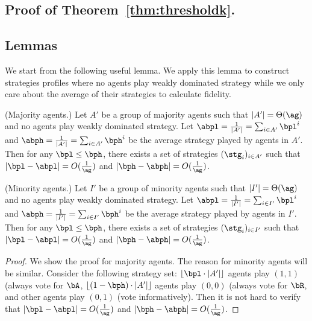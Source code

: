 \subsection{Proof of Theorem~\ref{thm:thresholdk}.}

\subsection{Lemmas}
We start from the following useful lemma. We apply this lemma to construct strategies profiles where no agents play weakly dominated strategy while we only care about the average of their strategies to calculate fidelity. 
\begin{lemma}
    (Majority agents.) Let $A'$ be a group of majority agents such that $|A'| = \Theta (\ag)$ and no agents play weakly dominated strategy. Let $\abpl = \frac{1}{|A'|}=\sum_{i \in A'} \bpl^i$ and $\abph = \frac{1}{|A'|}=\sum_{i \in A'} \bph^i$ be the average strategy played by agents in $A'$. Then for any $\bpl \le \bph$, there exists a set of strategies $(\stg_i)_{i\in A'}$ such that $|\bpl - \abpl| = O(\frac1{\ag})$ and $|\bph - \abph| = O(\frac1{\ag})$. 

    (Minority agents.) Let $I'$ be a group of minority agents such that $|I'| = \Theta (\ag)$ and no agents play weakly dominated strategy. Let $\abpl = \frac{1}{|I'|}=\sum_{i \in I'} \bpl^i$ and $\abph = \frac{1}{|I'|}=\sum_{i \in I'} \bph^i$ be the average strategy played by agents in $I'$. Then for any $\bpl \le \bph$, there exists a set of strategies $(\stg_i)_{i\in I'}$ such that $|\bpl - \abpl| = O(\frac1{\ag})$ and $|\bph - \abph| = O(\frac1{\ag})$. 
\end{lemma}

\begin{proof}
    We show the proof for majority agents. The reason for minority agents will be similar. Consider the following strategy set: $\lfloor \bpl \cdot |A'| \rfloor$ agents play $(1, 1)$ (always vote for $\bA$, $\lfloor (1 - \bph)\cdot |A'| \rfloor$ agents play $(0, 0)$ (always vote for $\bR$, and other agents play $(0, 1)$ (vote informatively). Then it is not hard to verify that $|\bpl - \abpl| = O(\frac1{\ag})$ and $|\bph - \abph| = O(\frac1{\ag})$. 
\end{proof}


